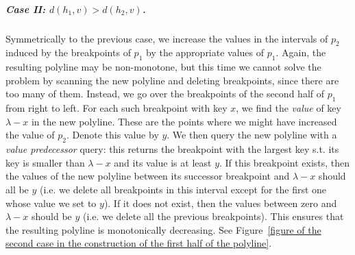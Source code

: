 \documentclass[a4paper,UKenglish]{lipics-v2016}
\theoremstyle{plain}
\renewcommand{\paragraph}{\subparagraph}
\begin{document}
\paragraph{Case II: \boldmath$d(h_1,v) > d(h_2,v)$.}
Symmetrically to the previous case, we increase the values in the intervals of $p_2$ induced by the breakpoints of $p_1$ by the appropriate values of $p_{1}$. Again, the resulting polyline may be non-monotone, but this time we cannot solve the problem by scanning the new polyline and deleting breakpoints, since there are too many of them. Instead, we go over the breakpoints of the second half of $p_1$ from right to left. For each such breakpoint  with key $x$, we find the {\em value} of key $\lambda - x$ in the new polyline. These are the points where we might have increased the value of $p_2$. Denote this value by $y$. We then query the new polyline with a \emph{value predecessor} query: this returns the breakpoint   with the largest key s.t. its key is smaller than $\lambda - x$ and its value is at least $y$. 
%
If this breakpoint exists, then the values of the new polyline between its successor breakpoint and $\lambda - x$ should all be $y$ (i.e. we delete all breakpoints in this interval except for the first one whose value we set to $y$). %
If it does not exist, then the values between zero and $\lambda - x$ should be $y$ (i.e. we delete all the previous breakpoints). 
This ensures that the resulting polyline is monotonically decreasing. 
See  Figure~\ref{figure of the second case in the construction of the first half of the polyline}.
\end{document}
